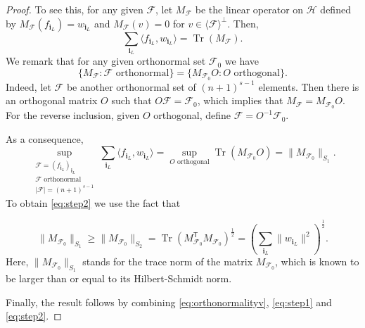 \documentclass[10pt,a4paper]{amsart}
\DeclareMathOperator{\Tr}{Tr}
\newcommand{\ind}[1]{\mathbf{#1}}
\begin{document}
\begin{proof}
To see this, for any given $\mathcal{F}$, let $M_{\mathcal{F}}$ be the linear operator on $\mathcal{H}$ defined by $M_{\mathcal{F}}(f_{{\ind{i}_L}})={w_{{\ind{i}_L}}}$ and $M_{\mathcal{F}}(v)=0$ for $v\in \langle \mathcal{F} \rangle ^\perp$. Then,
$$ \sum_{{\ind{i}_L}} \langle f_{{\ind{i}_L}}, w_{{\ind{i}_L}}\rangle =\Tr(M_{\mathcal{F}}).$$
We remark that for any given orthonormal set $\mathcal{F}_0$ we have
$$\{ M_{\mathcal{F}}: \mathcal{F} \mbox{ orthonormal}\}= \{ M_{\mathcal{F}_0} O: O \mbox{ orthogonal}\}.$$ Indeed, let $\mathcal{F}$ be another orthonormal set of $(n+1)^{s-1}$ elements. Then there is an orthogonal matrix $O$ such that $O \mathcal{F}= {\mathcal{F}_0}$, which implies that $M_{\mathcal{F}}=M_{\mathcal{F}_0} O.$ For the reverse inclusion, given $O$ orthogonal, define $\mathcal{F}=O^{-1}\mathcal{F}_0.$




As a consequence, $$ \sup _{\substack{\mathcal{F}=(f_{{\ind{i}_L}})_{{\ind{i}_L}}\\\mathcal{F}\text{ orthonormal}\\|\mathcal{F}|=(n+1)^{s-1}}} \sum_{{\ind{i}_L}} \langle f_{{\ind{i}_L}}, w_{{\ind{i}_L}}\rangle= \sup_{O \mbox{ orthogonal}} \Tr(M_{\mathcal{F}_0}O)=\|M_{\mathcal{F}_0}\|_{S_1}.$$ 
To obtain \eqref{eq:step2} we use the fact that 



    \begin{equation}
    \label{eq:stepschatten}
        \|M_{\mathcal{F}_0}\|_{S_1} \geq \|M_{\mathcal{F}_0}\|_{S_2} =  \Tr( M_{\mathcal{F}_0}^{\mathsf T} M_{\mathcal{F}_0})^\frac12= \left(\sum_{{\ind{i}_L}} \|w_{{\ind{i}_L}}\|^2\right)^\frac12.
    \end{equation} Here, $\|M_{\mathcal{F}_0}\|_{S_1}$ stands for the trace norm of the matrix $M_{\mathcal{F}_0}$, which is known to be larger than or equal to its Hilbert-Schmidt norm.
    
Finally, the result follows by combining \eqref{eq:orthonormalityv}, \eqref{eq:step1} and \eqref{eq:step2}.


\end{proof}
\end{document}
